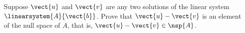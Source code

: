 Suppose $\vect{u}$ and $\vect{v}$ are any two solutions of the linear system $\linearsystem{A}{\vect{b}}$.  Prove that $\vect{u}-\vect{v}$ is an element of the null space of $A$, that is, $\vect{u}-\vect{v}\in\nsp{A}$.